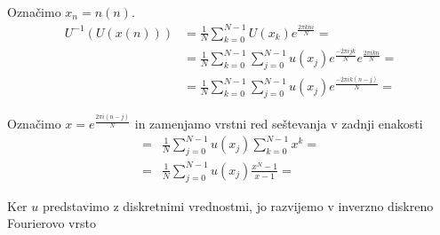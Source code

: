 \documentclass[mat2, tisk]{fmfdelo}
\begin{document}
\begin{dokaz}
Označimo $x_n = n(n)$.
\begin{align*}
  U^{-1}(U(x(n))) &= \frac{1}{N}\sum_{k=0}^{N-1} U(x_k) e^{\frac{2\pi k n i}{N}} = \\
  &= \frac{1}{N}\sum_{k=0}^{N-1} \sum_{j=0}^{N-1} u(x_j) e^{\frac{-2\pi i j k}{N}} e^{\frac{2\pi i k n }{N}} = \\
  &= \frac{1}{N}\sum_{k=0}^{N-1} \sum_{j=0}^{N-1} u(x_j) e^{\frac{-2\pi i k(n - j)}{N}} = 
\end{align*}

Označimo $x = e^{\frac{2\pi i (n-j)}{N}}$ in zamenjamo vrstni red seštevanja v 
zadnji enakosti 
\begin{align*}
=& \frac{1}{N}\sum_{j=0}^{N-1} u(x_j)\sum_{k=0}^{N-1} x^k = \\
=& \frac{1}{N}\sum_{j=0}^{N-1} u(x_j) \frac{x^N - 1}{x - 1} = 
\end{align*}


\end{dokaz}

\newpage
Ker $u$ predstavimo z diskretnimi vrednostmi, jo razvijemo v 
inverzno diskreno Fourierovo vrsto 
\end{document}
